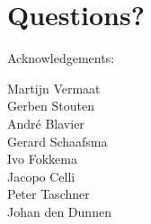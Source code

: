 \documentclass[slidestop]{beamer}
\begin{document}
\section{Questions?}
\lastpagetemplate
\begin{frame}
  \begin{center}
    Acknowledgements:
    \bigskip
    \bigskip

    Martijn Vermaat\\
    Gerben Stouten\\
    Andr\'e Blavier\\
    Gerard Schaafsma\\
    Ivo Fokkema\\
    Jacopo Celli\\
    Peter Taschner\\
    Johan den Dunnen
    \bigskip
    \bigskip
    \bigskip

  \end{center}
\end{frame}
\end{document}
